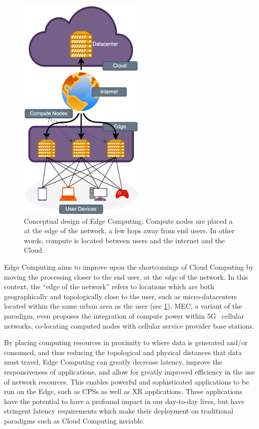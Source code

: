 \begin{figure}
    \centering
    \includegraphics[height=30em]{figures/edgecomputing}
    \caption{%
        Conceptual design of Edge Computing.
        Compute nodes are placed a at the edge of the network, a few hops away from end users.
        In other words, compute is located between users and the internet and the Cloud.
    }\label{fig:edgecomputing}
\end{figure}

Edge Computing aims to improve upon the shortcomings of Cloud Computing by moving the processing closer to the end user, at the \emph{edge} of the network.
In this context, the ``edge of the network'' refers to locations which are both geographically and topologically close to the user, such as micro-datacenters located within the same urban area as the user (see \cref{fig:edgecomputing}).
\gls{MEC}, a variant of the paradigm, even proposes the integration of compute power within 5G~\cite{5Gstandard} cellular networks, co-locating computed nodes with cellular service provider base stations.

By placing computing resources in proximity to where data is generated and/or consumed, and thus reducing the topological and physical distances that data must travel, Edge Computing can greatly decrease latency, improve the responsiveness of applications, and allow for greatly improved efficiency in the use of network resources.
This enables powerful and sophisticated applications to be run on the Edge, such as \glspl{CPS} as well as \gls{XR} applications.
These applications have the potential to have a profound impact in our day-to-day lives, but have stringent latency requirements which make their deployment on traditional paradigms such as Cloud Computing inviable.

